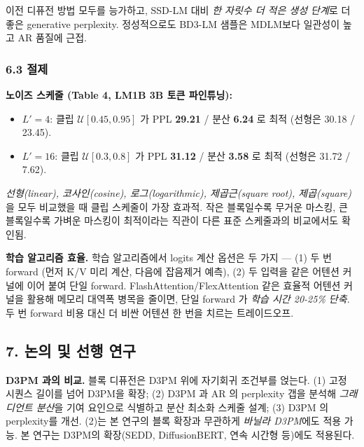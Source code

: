 \documentclass[
]{article}
\providecommand{\tightlist}{%
  \setlength{\itemsep}{0pt}\setlength{\parskip}{0pt}}
\begin{document}
이전 디퓨전 방법 모두를 능가하고, SSD-LM 대비 \emph{한 자릿수 더 적은
생성 단계}로 더 좋은 generative perplexity. 정성적으로도 BD3-LM 샘플은
MDLM보다 일관성이 높고 AR 품질에 근접.

\hypertarget{uxc808uxc81c}{%
\subsubsection{6.3 절제}\label{uxc808uxc81c}}

\textbf{노이즈 스케줄 (Table 4, LM1B 3B 토큰 파인튜닝):}

\begin{itemize}
\tightlist
\item
  \(L'=4\): 클립 \(\mathcal{U}[0.45, 0.95]\) 가 PPL \textbf{29.21} /
  분산 \textbf{6.24} 로 최적 (선형은 30.18 / 23.45).
\item
  \(L'=16\): 클립 \(\mathcal{U}[0.3, 0.8]\) 가 PPL \textbf{31.12} / 분산
  \textbf{3.58} 로 최적 (선형은 31.72 / 7.62).
\end{itemize}

\emph{선형(linear), 코사인(cosine), 로그(logarithmic), 제곱근(square
root), 제곱(square)} 을 모두 비교했을 때 클립 스케줄이 가장 효과적. 작은
블록일수록 무거운 마스킹, 큰 블록일수록 가벼운 마스킹이 최적이라는
직관이 다른 표준 스케줄과의 비교에서도 확인됨.

\textbf{학습 알고리즘 효율.} 학습 알고리즘에서 logits 계산 옵션은 두
가지 --- (1) 두 번 forward (먼저 K/V 미리 계산, 다음에 잡음제거 예측),
(2) 두 입력을 같은 어텐션 커널에 이어 붙여 단일 forward.
FlashAttention/FlexAttention 같은 효율적 어텐션 커널을 활용해 메모리
대역폭 병목을 줄이면, 단일 forward 가 \emph{학습 시간 20-25\% 단축}. 두
번 forward 비용 대신 더 비싼 어텐션 한 번을 치르는 트레이드오프.

\hypertarget{uxb17cuxc758-uxbc0f-uxc120uxd589-uxc5f0uxad6c}{%
\subsection{7. 논의 및 선행
연구}\label{uxb17cuxc758-uxbc0f-uxc120uxd589-uxc5f0uxad6c}}

\textbf{D3PM 과의 비교.} 블록 디퓨전은 D3PM 위에 자기회귀 조건부를
얹는다. (1) 고정 시퀀스 길이를 넘어 D3PM을 확장; (2) D3PM 과 AR 의
perplexity 갭을 분석해 \emph{그래디언트 분산}을 기여 요인으로 식별하고
분산 최소화 스케줄 설계; (3) D3PM 의 perplexity를 개선. (2)는 본 연구의
블록 확장과 무관하게 \emph{바닐라 D3PM}에도 적용 가능. 본 연구는 D3PM의
확장(SEDD, DiffusionBERT, 연속 시간형 등)에도 적용된다.
\end{document}
